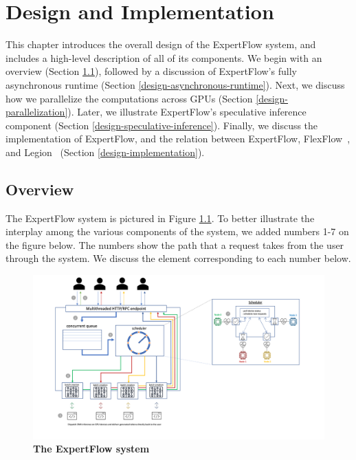 \chapter{Design and Implementation}\label{chapter-3}
This chapter introduces the overall design of the ExpertFlow system, and includes a high-level description of all of its components. We begin with an overview (Section \ref{design-overview}), followed by a discussion of ExpertFlow's fully asynchronous runtime (Section \ref{design-asynchronous-runtime}). Next, we discuss how we parallelize the computations across GPUs (Section \ref{design-parallelization}). Later, we illustrate ExpertFlow's speculative inference component (Section \ref{design-speculative-inference}). Finally, we discuss the implementation of ExpertFlow, and the relation between ExpertFlow, FlexFlow~\cite{flexflow}, and Legion~\cite{legion} (Section \ref{design-implementation}).

\section{Overview}\label{design-overview}
The ExpertFlow system is pictured in Figure \ref{fig:main-design-figure}. To better illustrate the interplay among the various components of the system, we added numbers 1-7 on the figure below. The numbers show the path that a request takes from the user through the system. We discuss the element corresponding to each number below.

\begin{figure}[H]
    \centering
    \includegraphics[width=\linewidth]{figures/design_illustration.png}
    \caption{\textbf{The ExpertFlow system}}
    \label{fig:main-design-figure}
\end{figure}

